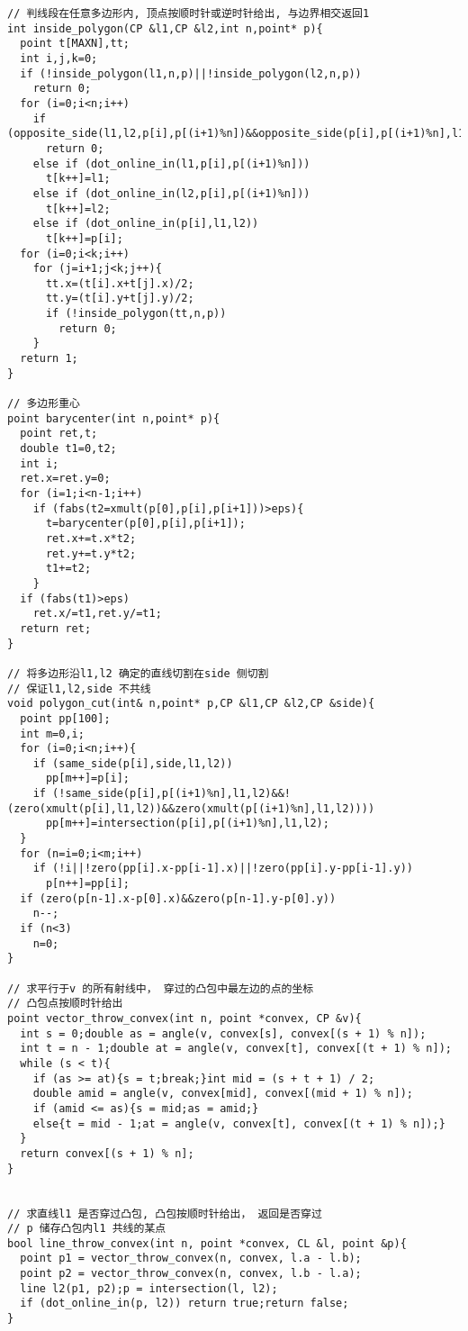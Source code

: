 \begin{lstlisting}[language={}]
// 判线段在任意多边形内, 顶点按顺时针或逆时针给出, 与边界相交返回1
int inside_polygon(CP &l1,CP &l2,int n,point* p){
  point t[MAXN],tt;
  int i,j,k=0;
  if (!inside_polygon(l1,n,p)||!inside_polygon(l2,n,p))
    return 0;
  for (i=0;i<n;i++)
    if (opposite_side(l1,l2,p[i],p[(i+1)%n])&&opposite_side(p[i],p[(i+1)%n],l1,l2))
      return 0;
    else if (dot_online_in(l1,p[i],p[(i+1)%n]))
      t[k++]=l1;
    else if (dot_online_in(l2,p[i],p[(i+1)%n]))
      t[k++]=l2;
    else if (dot_online_in(p[i],l1,l2))
      t[k++]=p[i];
  for (i=0;i<k;i++)
    for (j=i+1;j<k;j++){
      tt.x=(t[i].x+t[j].x)/2;
      tt.y=(t[i].y+t[j].y)/2;
      if (!inside_polygon(tt,n,p))
        return 0;     
    }
  return 1;
}

// 多边形重心
point barycenter(int n,point* p){
  point ret,t;
  double t1=0,t2;
  int i;
  ret.x=ret.y=0;
  for (i=1;i<n-1;i++)
    if (fabs(t2=xmult(p[0],p[i],p[i+1]))>eps){
      t=barycenter(p[0],p[i],p[i+1]);
      ret.x+=t.x*t2;
      ret.y+=t.y*t2;
      t1+=t2;
    }
  if (fabs(t1)>eps)
    ret.x/=t1,ret.y/=t1;
  return ret;
}

// 将多边形沿l1,l2 确定的直线切割在side 侧切割
// 保证l1,l2,side 不共线
void polygon_cut(int& n,point* p,CP &l1,CP &l2,CP &side){
  point pp[100];
  int m=0,i;
  for (i=0;i<n;i++){
    if (same_side(p[i],side,l1,l2))
      pp[m++]=p[i];
    if (!same_side(p[i],p[(i+1)%n],l1,l2)&&!(zero(xmult(p[i],l1,l2))&&zero(xmult(p[(i+1)%n],l1,l2))))
      pp[m++]=intersection(p[i],p[(i+1)%n],l1,l2);
  }
  for (n=i=0;i<m;i++)
    if (!i||!zero(pp[i].x-pp[i-1].x)||!zero(pp[i].y-pp[i-1].y))
      p[n++]=pp[i];
  if (zero(p[n-1].x-p[0].x)&&zero(p[n-1].y-p[0].y))
    n--;
  if (n<3)
    n=0;
}

// 求平行于v 的所有射线中， 穿过的凸包中最左边的点的坐标
// 凸包点按顺时针给出 
point vector_throw_convex(int n, point *convex, CP &v){
  int s = 0;double as = angle(v, convex[s], convex[(s + 1) % n]); 
  int t = n - 1;double at = angle(v, convex[t], convex[(t + 1) % n]);
  while (s < t){
    if (as >= at){s = t;break;}int mid = (s + t + 1) / 2;
    double amid = angle(v, convex[mid], convex[(mid + 1) % n]);
    if (amid <= as){s = mid;as = amid;}
    else{t = mid - 1;at = angle(v, convex[t], convex[(t + 1) % n]);}
  }
  return convex[(s + 1) % n];
}


// 求直线l1 是否穿过凸包, 凸包按顺时针给出， 返回是否穿过
// p 储存凸包内l1 共线的某点 
bool line_throw_convex(int n, point *convex, CL &l, point &p){
  point p1 = vector_throw_convex(n, convex, l.a - l.b);
  point p2 = vector_throw_convex(n, convex, l.b - l.a);
  line l2(p1, p2);p = intersection(l, l2);
  if (dot_online_in(p, l2)) return true;return false;
}


\end{lstlisting}
